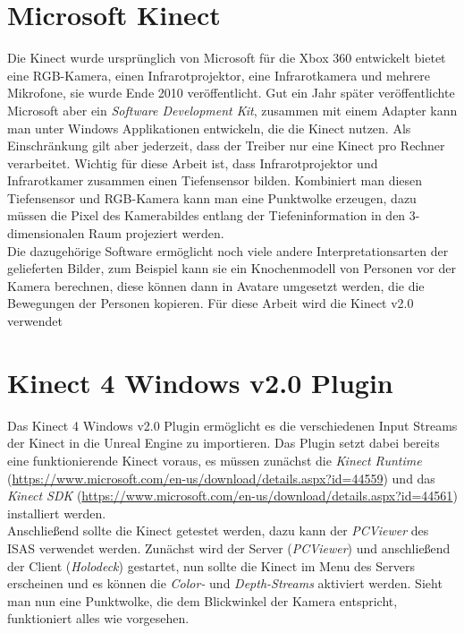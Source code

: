 \documentclass[a4paper]{IEEEtran}
\begin{document}
\section{Microsoft Kinect}
	Die Kinect wurde ursprünglich von Microsoft für die Xbox 360 entwickelt bietet eine RGB-Kamera, einen Infrarotprojektor, eine Infrarotkamera und mehrere Mikrofone, sie wurde Ende 2010 veröffentlicht. 
	Gut ein Jahr später veröffentlichte Microsoft aber ein \textit{Software Development Kit}, zusammen mit einem Adapter kann man unter Windows Applikationen entwickeln, die die Kinect nutzen.
	Als Einschränkung gilt aber jederzeit, dass der Treiber nur eine Kinect pro Rechner verarbeitet.
	Wichtig für diese Arbeit ist, dass Infrarotprojektor und Infrarotkamer zusammen einen Tiefensensor bilden. 
	Kombiniert man diesen Tiefensensor und RGB-Kamera kann man eine Punktwolke erzeugen, dazu müssen die Pixel des Kamerabildes entlang der Tiefeninformation in den 3-dimensionalen Raum projeziert werden. \\
	Die dazugehörige Software ermöglicht noch viele andere Interpretationsarten der gelieferten Bilder, zum Beispiel kann sie ein Knochenmodell von Personen vor der Kamera berechnen, diese können dann in Avatare umgesetzt werden, die die Bewegungen der Personen kopieren.
	Für diese Arbeit wird die Kinect v2.0 verwendet

\section{Kinect 4 Windows v2.0 Plugin}
	Das Kinect 4 Windows v2.0 Plugin ermöglicht es die verschiedenen Input Streams der Kinect in die Unreal Engine zu importieren. Das Plugin setzt dabei bereits eine funktionierende Kinect voraus, es müssen zunächst die {\textit{Kinect Runtime}} ({\url{https://www.microsoft.com/en-us/download/details.aspx?id=44559}}) und das {\textit{Kinect SDK}} ({\url{https://www.microsoft.com/en-us/download/details.aspx?id=44561}}) installiert werden. \\
	Anschließend sollte die Kinect getestet werden, dazu kann der {\textit{PCViewer}} des ISAS verwendet werden. 
	Zunächst wird der Server ({\textit{PCViewer}}) und anschließend der Client ({\textit{Holodeck}}) gestartet, nun sollte die Kinect im Menu des Servers erscheinen und es können die {\textit{Color-}} und {\textit{Depth-Streams}} aktiviert werden. 
	Sieht man nun eine Punktwolke, die dem Blickwinkel der Kamera entspricht, funktioniert alles wie vorgesehen.\\
\end{document}
